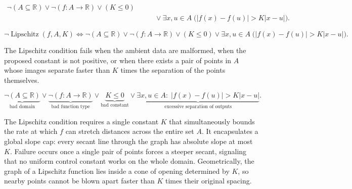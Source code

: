 \begin{remark*}
\[
\begin{aligned}
\neg(A\subseteq\mathbb{R})\lor\neg(f:A\to\mathbb{R})\lor(K\le 0)\\
&\qquad\lor\exists x,u \in A\;\bigl(|f(x)-f(u)| > K|x-u|\bigr).
\end{aligned}
\]
\end{remark*}

\begin{remark*}
\[
\neg \operatorname{Lipschitz}(f,A,K) \Longleftrightarrow
\neg(A\subseteq\mathbb{R})\lor\neg(f:A\to\mathbb{R})\lor(K\le 0)\lor
\exists x,u \in A\;\bigl(|f(x)-f(u)| > K|x-u|\bigr).
\]
\end{remark*}

\begin{remark*}
The Lipschitz condition fails when the ambient data are malformed, when
the proposed constant is not positive, or when there exists a pair of
points in $A$ whose images separate faster than $K$ times the separation
of the points themselves.
\end{remark*}

\begin{remark*}
\[
\underbrace{\neg(A\subseteq\mathbb{R})}_{\text{bad domain}}
\lor
\underbrace{\neg(f:A\to\mathbb{R})}_{\text{bad function type}}
\lor
\underbrace{K\le 0}_{\text{bad constant}}
\lor
\underbrace{\exists x,u \in A:\; |f(x)-f(u)| > K|x-u|}_{\text{excessive separation of outputs}}.
\]
\end{remark*}

\begin{remark*}[Interpretation]
The Lipschitz condition requires a single constant $K$ that simultaneously bounds the rate at which $f$ can stretch distances across the entire set $A$. It encapsulates a global slope cap: every secant line through the graph has absolute slope at most $K$. Failure occurs once a single pair of points forces a steeper secant, signaling that no uniform control constant works on the whole domain. Geometrically, the graph of a Lipschitz function lies inside a cone of opening determined by $K$, so nearby points cannot be blown apart faster than $K$ times their original spacing.
\end{remark*}

\NoLocalDependencies

